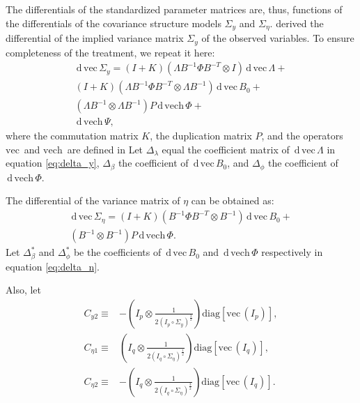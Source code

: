 \documentclass[a4paper,11pt]{article}
\newcommand{\n}{\eta}
\renewcommand{\l}{\lambda}
\renewcommand{\b}{\beta}
\newcommand{\p}{\phi}
\renewcommand{\d}{\,\mathrm{d}\,}
\newcommand{\definedas}{\equiv}
\newcommand{\kronprod}{\otimes}
\newcommand{\hadaprod}{\circ}
\newcommand{\diag}{\mathrm{diag}}
\renewcommand{\vec}{\mathrm{vec}\,}
\newcommand{\vech}{\mathrm{vech}\,}
\newcommand{\0}{\boldsymbol{0}}
\begin{document}
The differentials of the standardized parameter matrices are, thus, 
functions of the differentials of the covariance structure models $\Sigma_y$
and
$\Sigma_\n$.
\cite{neudecker1991linear} derived the differential of the implied variance
matrix $\Sigma_y$ of the observed variables. To ensure completeness of the treatment, we repeat it here:
\begin{equation}\label{eq:delta_y}
\begin{split}
\d\vec \Sigma_y = (I + K) (\Lambda B^{-1} \Phi B^{-T} \kronprod I) 
\d\vec\Lambda 
+ \\
(I + K) (\Lambda B^{-1} \Phi B^{-T} \kronprod \Lambda B^{-1}) \d\vec B_0
+ \\
(\Lambda B^{-1} \kronprod \Lambda B^{-1}) P \d \vech \Phi
+ \\
\d \vech \Psi,
\end{split}
\end{equation}
where the commutation matrix $K$, the duplication matrix $P$, and the operators
$\vec$ and $\vech$ are defined in \cite{magnus1988matrix}
Let $\Delta_\l$ equal the coefficient matrix
 of $\d\vec\Lambda$ in equation \ref{eq:delta_y}, 
$\Delta_\b$ the coefficient  of $\d\vec B_0$, and
$\Delta_\p$ the coefficient  of $\d\vech\Phi$.


The differential of the variance matrix of $\n$ can be obtained as:
\begin{equation}\label{eq:delta_n}
\begin{split}
\d\vec \Sigma_\n = 
(I + K) (B^{-1} \Phi B^{-T} \kronprod  B^{-1}) \d\vec B_0
+ \\
(B^{-1} \kronprod  B^{-1}) P \d \vech \Phi.
\end{split}
\end{equation}
Let $\Delta^*_\b$ and $\Delta^*_\p$  be the coefficients of $\d\vec B_0$ and
$\d\vech\Phi$ respectively in equation \ref{eq:delta_n}.

Also, let
\begin{align}
    C_{y2} \definedas&
        - (I_p \kronprod \frac{1}{2 (I_p \hadaprod \Sigma_y)^{\frac{3}{2}}})
        \diag[\vec(I_p)],
\\
    C_{\n1} \definedas&
        (I_q \kronprod \frac{1}{2 (I_q \hadaprod \Sigma_\n)^{\frac{1}{2}}})
        \diag[\vec(I_q)],
\\
    C_{\n2} \definedas&
        - (I_q \kronprod \frac{1}{2 (I_q \hadaprod \Sigma_\n)^{\frac{3}{2}}})
        \diag[\vec(I_q)].
\end{align}
\end{document}
